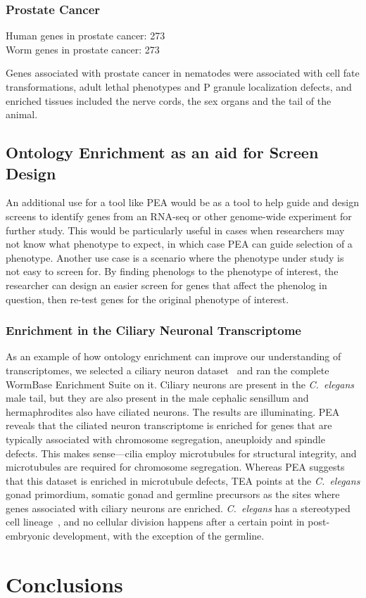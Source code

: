 \documentclass[10pt,letterpaper,twocolumn]{article}
\newcommand{\cel}{\emph{C.~elegans}}
\begin{document}
\subsubsection*{Prostate Cancer}
Human genes in prostate cancer: 273\\
Worm genes in prostate cancer: 273

Genes associated with prostate cancer in nematodes were associated with cell fate
transformations, adult lethal phenotypes and P granule localization defects,
and enriched tissues included the nerve cords, the sex organs and the tail of the
animal.

\subsection*{Ontology Enrichment as an aid for Screen Design}
An additional use for a tool like PEA would be as a tool to help guide and
design screens to identify genes from an RNA-seq or other genome-wide experiment
for further study. This would be particularly useful in cases when researchers
may not know what phenotype to expect, in which case PEA can guide selection of
a phenotype. Another use case is a scenario where the phenotype under study is
not easy to screen for. By finding phenologs to the phenotype of interest, the
researcher can design an easier screen for genes that affect the phenolog in
question, then re-test genes for the original phenotype of interest.

\subsubsection*{Enrichment in the Ciliary Neuronal Transcriptome}
As an example of how ontology enrichment can improve our understanding of
transcriptomes,
we selected a ciliary neuron dataset~\cite{} and ran the complete WormBase
Enrichment Suite on it. Ciliary neurons are present in the \cel{} male tail, but
they are also present in the male cephalic sensillum and hermaphrodites also have
ciliated neurons. The results are illuminating. PEA reveals that the ciliated
neuron transcriptome is enriched for genes that are typically associated with
chromosome segregation, aneuploidy and spindle defects. This makes sense---cilia
employ microtubules for structural integrity, and microtubules are required for
chromosome segregation. Whereas PEA suggests that this dataset is enriched in
microtubule defects, TEA points at the \cel{} gonad primordium, somatic gonad
and germline precursors as the sites where genes associated with ciliary neurons
are enriched.  \cel{} has a stereotyped cell lineage~\cite{}, and no cellular
division happens after a certain point in post-embryonic development, with the
exception of the germline.



\section*{Conclusions}
\end{document}
